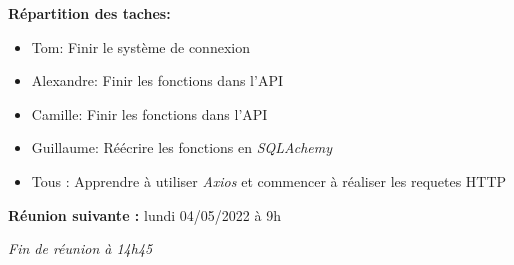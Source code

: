 \documentclass[12pt,a4paper,final]{report}
\begin{document}
\begin{flushleft}
    \textbf{Répartition des taches:}
\end{flushleft}
\begin{itemize}
    \item Tom: Finir le système de connexion
    \item Alexandre: Finir les fonctions dans l'API
    \item Camille: Finir les fonctions dans l'API
    \item Guillaume: Réécrire les fonctions en \textit{SQLAchemy}
    \item Tous : Apprendre à utiliser \textit{Axios} et commencer à réaliser les requetes HTTP
\end{itemize}

\begin{flushleft}
    \textbf{Réunion suivante :} lundi 04/05/2022 à 9h
\end{flushleft}

\textit{Fin de réunion à 14h45}
\end{document}
